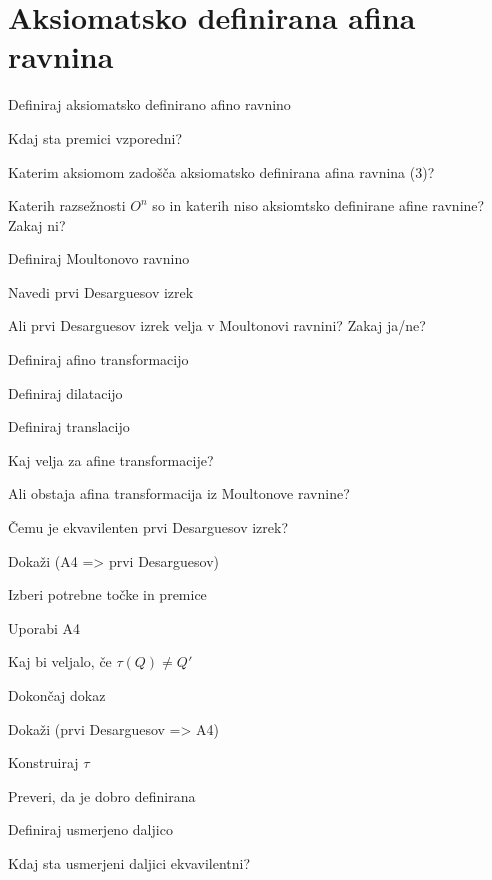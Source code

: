 \documentclass{article}
\begin{document}
    \section{Aksiomatsko definirana afina ravnina}
    \begin{enumerate}
        \item Definiraj aksiomatsko definirano afino ravnino
        \item Kdaj sta premici vzporedni?
        \item Katerim aksiomom zadošča aksiomatsko definirana afina ravnina (3)?
        \item Katerih razsežnosti $O^n$ so in katerih niso aksiomtsko definirane afine ravnine? Zakaj ni?
        \item Definiraj Moultonovo ravnino
        \item Navedi prvi Desarguesov izrek
        \item Ali prvi Desarguesov izrek velja v Moultonovi ravnini? Zakaj ja/ne?
        \item Definiraj afino transformacijo
        \item Definiraj dilatacijo
        \item Definiraj translacijo
        {\color{blue}\item Kaj velja za afine transformacije?}
        {\color{red}\item Ali obstaja afina transformacija iz Moultonove ravnine?}
        {\color{red}\item Čemu je ekvavilenten prvi Desarguesov izrek?}
        \begin{itemize}
            {\color{red}\item Dokaži (A4 => prvi Desarguesov) }
            {\color{red}\item Izberi potrebne točke in premice}
            {\color{red}\item Uporabi A4}
            {\color{red}\item Kaj bi veljalo, če $\tau (Q) \neq Q'$}
            {\color{red}\item Dokončaj dokaz}
            {\color{red}\item Dokaži (prvi Desarguesov => A4)}
            {\color{red}\item Konstruiraj $\tau$}
            {\color{red}\item Preveri, da je dobro definirana}
        \end{itemize}
        \item Definiraj usmerjeno daljico
        \item Kdaj sta usmerjeni daljici ekvavilentni?

\end{enumerate}
\end{document}
